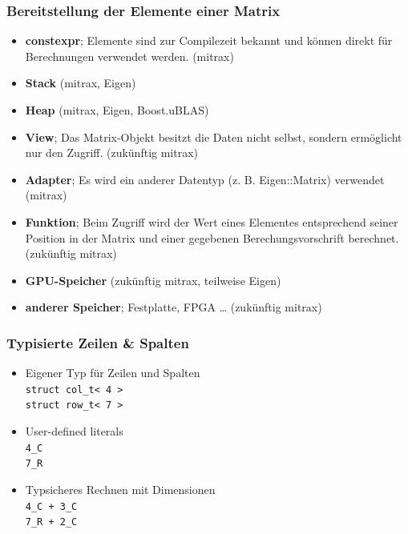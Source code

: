 \documentclass{beamer}
\newcommand{\cmark}{\ding{51}}
\newcommand{\xmark}{\ding{55}}
\begin{document}
\begin{frame}
    \frametitle{Bereitstellung der Elemente einer Matrix}
    \begin{itemize}
        \item \textbf{constexpr}; Elemente sind zur Compilezeit bekannt und können direkt für Berechnungen verwendet werden. (mitrax)
        \item \textbf{Stack} (mitrax, Eigen)
        \item \textbf{Heap} (mitrax, Eigen, Boost.uBLAS)
        \item \textbf{View}; Das Matrix-Objekt besitzt die Daten nicht selbst, sondern ermöglicht nur den Zugriff. (zukünftig mitrax)
        \item \textbf{Adapter}; Es wird ein anderer Datentyp (z. B. Eigen::Matrix) verwendet (mitrax)
        \item \textbf{Funktion}; Beim Zugriff wird der Wert eines Elementes entsprechend seiner Position in der Matrix und einer gegebenen Berechungsvorschrift berechnet. (zukünftig mitrax)
        \item \textbf{GPU-Speicher} (zukünftig mitrax, teilweise Eigen)
        \item \textbf{anderer Speicher}; Festplatte, FPGA … (zukünftig mitrax)
    \end{itemize}
\end{frame}
\begin{frame}
    \frametitle{Typisierte Zeilen \& Spalten}
    \begin{itemize}
        \item Eigener Typ für Zeilen und Spalten \\
            \hspace{1em}\texttt{struct col\_t< 4 >} \\
            \hspace{1em}\texttt{struct row\_t< 7 >}
        \item User-defined literals \\
        \hspace{1em}\texttt{4\_C} \\
        \hspace{1em}\texttt{7\_R}
        \item Typsicheres Rechnen mit Dimensionen \\
        \hspace{1em}\texttt{4\_C + 3\_C \cmark} \\
        \hspace{1em}\texttt{7\_R + 2\_C \xmark}
    \end{itemize}
\end{frame}
\end{document}
